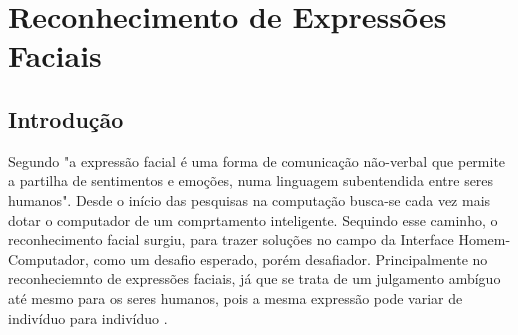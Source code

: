 \chapter{Reconhecimento de Expressões Faciais}

\section{Introdução}
Segundo  "a expressão facial é uma forma de comunicação não-verbal que permite a partilha de
sentimentos e emoções, numa linguagem subentendida entre seres humanos". Desde o início das pesquisas na computação busca-se cada vez mais dotar o computador de um comprtamento inteligente. Sequindo esse caminho, o reconhecimento facial surgiu,  para trazer soluções no campo da Interface Homem- Computador, como um desafio esperado, porém desafiador. Principalmente no reconheciemnto de expressões faciais, já que se trata de um julgamento ambíguo até mesmo para os seres humanos, pois a mesma expressão pode variar de indivíduo para indivíduo \cite{FernandoGil} \cite{Elizabeth}.

